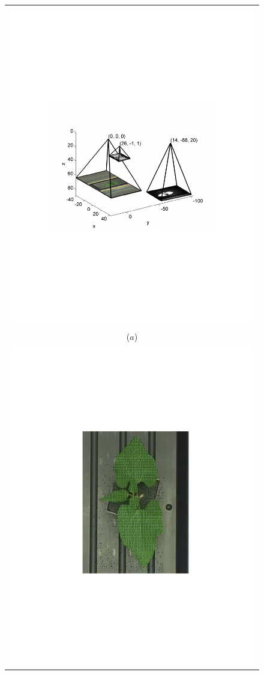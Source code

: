 \begin{figure}
\begin{tabular}{c}
  \includegraphics[width=\linewidth,trim=60 200 45 250,clip]{Figures/CameraConfiguration} \\
  ($a$)\\
  \includegraphics[width=0.65\linewidth,trim=175 220 162 180, clip,angle=-90,origin=c]{Figures/DepthOnBeanRGB} \vspace{-10mm} \\ 

\end{tabular}
\end{figure}
